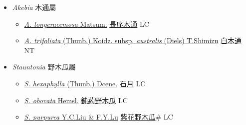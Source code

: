 
  \begin{itemize}
 \item[] \textit{Akebia} 木通屬
                    
  \begin{itemize}
        \item[] \href{http://www.theplantlist.org/tpl1.1/search?q=Akebia+longeracemosa}{\textit{A. longeracemosa} Matsum.}   \href{\detokenize{http://taibnet.sinica.edu.tw/chi/taibnet_species_list.php?T2=長序木通&T2_new_value=true&fr=y}}{長序木通} LC
        \item[] \href{http://www.theplantlist.org/tpl1.1/search?q=Akebia+trifoliata+subsp.+australis}{\textit{A. trifoliata} (Thunb.) Koidz. subsp. \textit{australis} (Diels) T.Shimizu}   \href{\detokenize{http://taibnet.sinica.edu.tw/chi/taibnet_species_list.php?T2=白木通&T2_new_value=true&fr=y}}{白木通} NT
  \end{itemize}
 \item[] \textit{Stauntonia} 野木瓜屬
                    
  \begin{itemize}
        \item[] \href{http://www.theplantlist.org/tpl1.1/search?q=Stauntonia+hexaphylla}{\textit{S. hexaphylla} (Thunb.) Dcene.}     \href{\detokenize{http://taibnet.sinica.edu.tw/chi/taibnet_species_list.php?T2=石月&T2_new_value=true&fr=y}}{石月} LC
        \item[] \href{http://www.theplantlist.org/tpl1.1/search?q=Stauntonia+obovata}{\textit{S. obovata} Hemsl.}   \href{\detokenize{http://taibnet.sinica.edu.tw/chi/taibnet_species_list.php?T2=鈍葯野木瓜&T2_new_value=true&fr=y}}{鈍葯野木瓜} LC
        \item[] \href{http://www.theplantlist.org/tpl1.1/search?q=Stauntonia+purpurea}{\textit{S. purpurea} Y.C.Liu \& F.Y.Lu}   \href{\detokenize{http://taibnet.sinica.edu.tw/chi/taibnet_species_list.php?T2=紫花野木瓜&T2_new_value=true&fr=y}}{紫花野木瓜}\# LC
  \end{itemize}
  \end{itemize}
